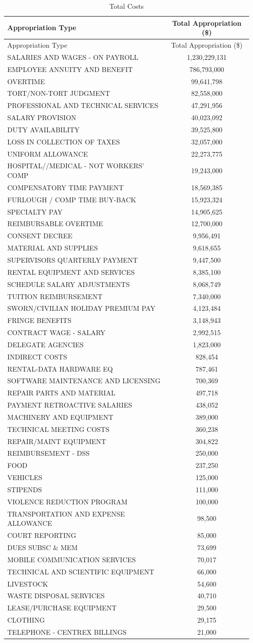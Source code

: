 \documentclass[
]{article}
\begin{document}
\begin{longtable}[]{@{}lc@{}}
\caption{Total Costs}\tabularnewline
\toprule
Appropriation Type & Total Appropriation (\$)\tabularnewline
\midrule
\endfirsthead
\toprule
Appropriation Type & Total Appropriation (\$)\tabularnewline
\midrule
\endhead
SALARIES AND WAGES - ON PAYROLL & 1,230,229,131\tabularnewline
EMPLOYEE ANNUITY AND BENEFIT & 786,793,000\tabularnewline
OVERTIME & 99,641,798\tabularnewline
TORT/NON-TORT JUDGMENT & 82,558,000\tabularnewline
PROFESSIONAL AND TECHNICAL SERVICES & 47,291,956\tabularnewline
SALARY PROVISION & 40,023,092\tabularnewline
DUTY AVAILABILITY & 39,525,800\tabularnewline
LOSS IN COLLECTION OF TAXES & 32,057,000\tabularnewline
UNIFORM ALLOWANCE & 22,273,775\tabularnewline
HOSPITAL//MEDICAL - NOT WORKERS' COMP & 19,243,000\tabularnewline
COMPENSATORY TIME PAYMENT & 18,569,385\tabularnewline
FURLOUGH / COMP TIME BUY-BACK & 15,923,324\tabularnewline
SPECIALTY PAY & 14,905,625\tabularnewline
REIMBURSABLE OVERTIME & 12,700,000\tabularnewline
CONSENT DECREE & 9,956,491\tabularnewline
MATERIAL AND SUPPLIES & 9,618,655\tabularnewline
SUPERVISORS QUARTERLY PAYMENT & 9,447,500\tabularnewline
RENTAL EQUIPMENT AND SERVICES & 8,385,100\tabularnewline
SCHEDULE SALARY ADJUSTMENTS & 8,068,749\tabularnewline
TUITION REIMBURSEMENT & 7,340,000\tabularnewline
SWORN/CIVILIAN HOLIDAY PREMIUM PAY & 4,123,484\tabularnewline
FRINGE BENEFITS & 3,148,943\tabularnewline
CONTRACT WAGE - SALARY & 2,992,515\tabularnewline
DELEGATE AGENCIES & 1,823,000\tabularnewline
INDIRECT COSTS & 828,454\tabularnewline
RENTAL-DATA HARDWARE EQ & 787,461\tabularnewline
SOFTWARE MAINTENANCE AND LICENSING & 700,369\tabularnewline
REPAIR PARTS AND MATERIAL & 497,718\tabularnewline
PAYMENT RETROACTIVE SALARIES & 438,052\tabularnewline
MACHINERY AND EQUIPMENT & 389,000\tabularnewline
TECHNICAL MEETING COSTS & 360,238\tabularnewline
REPAIR/MAINT EQUIPMENT & 304,822\tabularnewline
REIMBURSEMENT - DSS & 250,000\tabularnewline
FOOD & 237,250\tabularnewline
VEHICLES & 125,000\tabularnewline
STIPENDS & 111,000\tabularnewline
VIOLENCE REDUCTION PROGRAM & 100,000\tabularnewline
TRANSPORTATION AND EXPENSE ALLOWANCE & 98,500\tabularnewline
COURT REPORTING & 85,000\tabularnewline
DUES SUBSC \& MEM & 73,699\tabularnewline
MOBILE COMMUNICATION SERVICES & 70,017\tabularnewline
TECHNICAL AND SCIENTIFIC EQUIPMENT & 66,000\tabularnewline
LIVESTOCK & 54,600\tabularnewline
WASTE DISPOSAL SERVICES & 40,710\tabularnewline
LEASE/PURCHASE EQUIPMENT & 29,500\tabularnewline
CLOTHING & 29,175\tabularnewline
TELEPHONE - CENTREX BILLINGS & 21,000\tabularnewline

\end{longtable}
\end{document}
